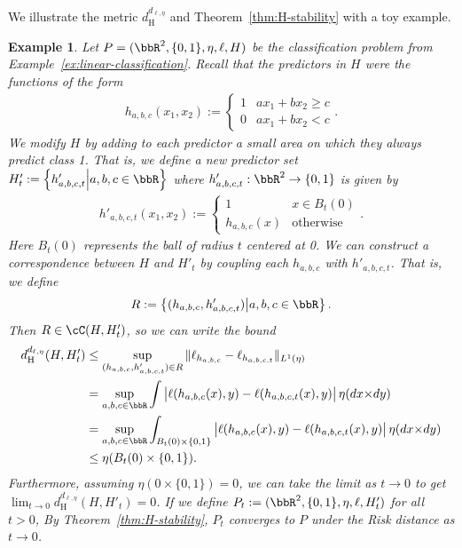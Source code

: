 \documentclass[twoside,11pt]{article}
\newtheorem{examples}[theorem]{Example}
\newcommand{\set}[2]{\left\{ #1\middle| #2\right\}}
\newcommand{\dH}{d_\mathrm{H}}
\begin{document}
    We illustrate the metric $\dH^{d_{\ell,\eta}}$ and Theorem~\ref{thm:H-stability} with a toy example.
    \begin{examples}
        Let $P = (\bbR^2, \{0,1\}, \eta, \ell, H)$ be the classification problem from Example~\ref{ex:linear-classification}. Recall that the predictors in $H$ were the functions of the form
        \begin{align*}
            h_{a,b,c}(x_1,x_2) := \begin{cases}
            1 & ax_1 + bx_2 \geq c \\
            0 & ax_1 + bx_2 < c
            \end{cases}.
        \end{align*}
        We modify $H$ by adding to each predictor a small area on which they always predict class 1. That is, we define a new predictor set $H'_t := \set{h'_{a,b,c,t}}{a,b,c\in\bbR}$ where $h'_{a,b,c,t}:\bbR^2\to \{0,1\}$ is given by
        \begin{align*}
            h'_{a,b,c,t}(x_1,x_2) := \begin{cases}
                1 & x\in B_t(0)\\
                h_{a,b,c}(x) & \text{otherwise} 
            \end{cases}.
        \end{align*}
        Here $B_t(0)$ represents the ball of radius $t$ centered at 0.
        We can construct a correspondence between $H$ and $H'_t$ by coupling each $h_{a,b,c}$ with $h'_{a,b,c,t}$. That is, we define
        \[R := \set{(h_{a,b,c},h'_{a,b,c,t})}{a,b,c \in \bbR}.\]
        Then $R\in \cC(H,H'_t)$, so we can write the bound
        \begin{align*}
            \dH^{d_{\ell,\eta}}(H,H'_t)
            & \leq \sup_{(h_{a,b,c},h'_{a,b,c,t})\in R} \| \ell_{h_{a,b,c}} - \ell_{h_{a,b,c,t}}\|_{L^1(\eta)}
            \\ & =
            \sup_{a,b,c \in \bbR} \int \big| \ell(h_{a,b,c}(x),y) - \ell(h_{a,b,c,t}(x),y) \big| \,\eta(dx{\times}dy)
            \\ & =
            \sup_{a,b,c \in \bbR} \int_{B_t(0)\times \{0,1\}} \big| \ell(h_{a,b,c}(x),y) - \ell(h_{a,b,c,t}(x),y) \big| \,\eta(dx{\times}dy)
            \\ & \leq \eta(B_t(0)\times\{0,1\}). 
        \end{align*}
        Furthermore, assuming $\eta({0}\times \{0,1\})=0$, we can take the limit as $t\to 0$ to get $\lim_{t\to0} \dH^{d_{\ell,\eta}}(H,H'_t) = 0$. If we define $P_t := (\bbR^2, \{0,1\}, \eta, \ell, H'_t)$ for all $t>0$, By Theorem~\ref{thm:H-stability}, $P_t$ converges to $P$ under the Risk distance as $t\to 0$.
    \end{examples}
\end{document}
